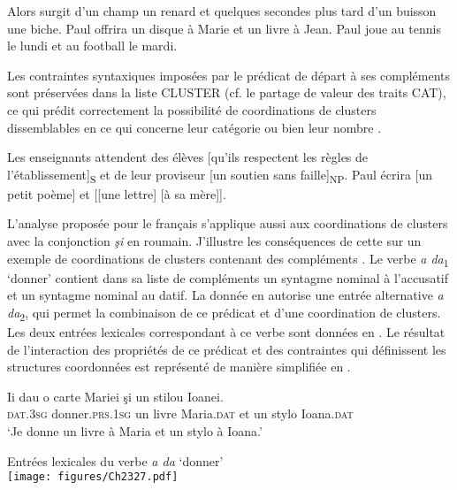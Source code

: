 \ea \label{ch2:ex324}
\ea Alors surgit d’un champ un renard et quelques secondes plus tard d’un buisson une biche. \label{ch2:ex324a} 
\ex Paul offrira un disque à Marie et un livre à Jean. \label{ch2:ex324b}
\ex Paul joue au tennis le lundi et au football le mardi. \label{ch2:ex324c}
\z
\z

Les contraintes syntaxiques imposées par le prédicat de départ à ses compléments sont préservées dans la liste CLUSTER (cf. le partage de valeur des traits CAT), ce qui prédit correctement la possibilité de coordinations de clusters dissemblables en ce qui concerne leur catégorie  ou bien leur nombre . 

\ea \label{ch2:ex325}
\ea Les enseignants attendent des élèves [qu’ils respectent les règles de l’établissement]\textsubscript{S} et de leur proviseur [un soutien sans faille]\textsubscript{NP}. \label{ch2:ex325a}
\ex Paul écrira [un petit poème] et [[une lettre] [à sa mère]]. \citep[337]{Mouret2007} \label{ch2:ex325b} 
\z
\z

L’analyse proposée pour le français s’applique aussi aux coordinations de clus\-ters avec la conjonction \textit{şi} en roumain. J’illustre les conséquences de cette  sur un exemple de coordinations de clusters contenant des compléments . Le verbe \textit{a da}\textsubscript{1} ‘donner’ contient dans sa liste de compléments un syntagme nominal à l’accusatif et un syntagme nominal au datif. La  donnée en  autorise une entrée alternative \textit{a da}\textsubscript{2}, qui permet la combinaison de ce prédicat et d’une coordination de clusters. Les deux entrées lexicales correspondant à ce verbe sont données en . Le résultat de l’interaction des propriétés de ce prédicat et des contraintes qui définissent les structures coordonnées est représenté de manière simplifiée en .    

\ea \label{ch2:ex326}
\gll Ii  dau  o  carte  Mariei  şi  un  stilou  Ioanei.\\
\textsc{dat.3sg} donner.\textsc{prs.1sg}  un  livre  Maria.\textsc{dat}  et  un  stylo  Ioana.\textsc{dat}\\
\glt ‘Je donne un livre à Maria et un stylo à Ioana.’
\z

\ea \label{ch2:ex327}
Entrées lexicales du verbe \textit{a da} ‘donner’\\
\texttt{[image: figures/Ch2327.pdf]}


